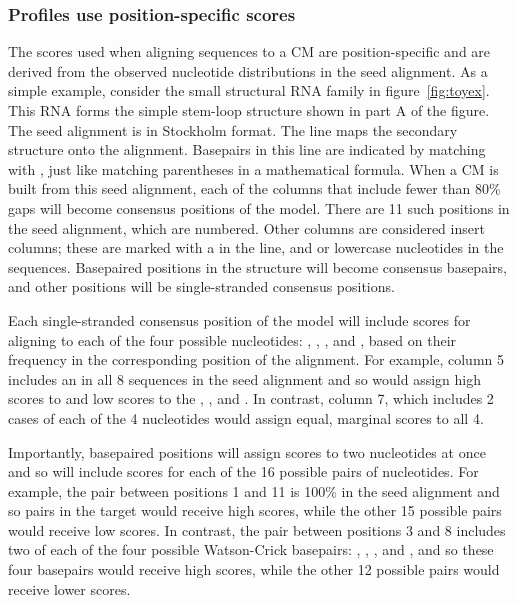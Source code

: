 \subsubsection{Profiles use position-specific scores}

The scores used when aligning sequences to a CM are position-specific
and are derived from the observed nucleotide distributions in the seed
alignment. As a simple example, consider the small structural RNA
family in figure~\ref{fig:toyex}. This RNA forms the simple stem-loop
structure shown in part A of the figure. The seed alignment is in
Stockholm format. The  line maps the secondary
structure onto the alignment. Basepairs in this line are indicated by
matching \prog{<} with \prog{>}, just like matching parentheses in a mathematical
formula. When a CM is built from this seed alignment, each of the
columns that include fewer than 80\% gaps will become consensus
positions of the model. There are 11 such positions in the seed
alignment, which are numbered. Other columns are considered insert columns;
these are marked with a  in the  line, and
 or lowercase nucleotides in the sequences. Basepaired
positions in the structure will become consensus basepairs, and other
positions will be single-stranded consensus positions. 

Each single-stranded consensus position of the model will include
scores for aligning to each of the four possible nucleotides:
, , , and , based on their frequency
in the corresponding position of the alignment. For example, column 5
includes an  in all 8 sequences in the seed alignment and so
would assign high scores to  and low scores to the ,
, and . In contrast, column 7, which includes 2 cases of each
of the 4 nucleotides would assign equal, marginal scores to all
4.  

Importantly, basepaired positions will assign
scores to two nucleotides at once and so will include scores for each
of the 16 possible pairs of nucleotides. For example, the pair between
positions 1 and 11 is 100\%  in the seed alignment and so
 pairs in the target would receive high scores, while the
other 15 possible pairs would receive low scores. In contrast, the
pair between positions 3 and 8 includes two of each of the four
possible Watson-Crick basepairs: , , , and
, and so these four basepairs would receive high scores,
while the other 12 possible pairs would receive lower
scores. 

